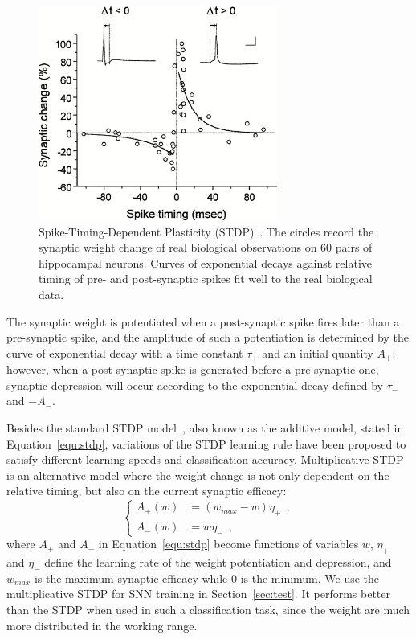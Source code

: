 \begin{figure}[bt!]
	\centering
	\includegraphics[width=0.7\textwidth]{pics_snn/stdp.jpeg}
	\caption[Spike-Timing-Dependent Plasticity (STDP)~\citep{bi2001synaptic}.]{Spike-Timing-Dependent Plasticity (STDP)~\citep{bi2001synaptic}.
	The circles record the synaptic weight change of real biological observations on 60 pairs of hippocampal neurons.
	Curves of exponential decays against relative timing of pre- and post-synaptic spikes fit well to the real biological data.
	}
	\label{Fig:STDP}
\end{figure}

The synaptic weight is potentiated when a post-synaptic spike fires later than a pre-synaptic spike, and the amplitude of such a potentiation is determined by the curve of exponential decay with a time constant $\tau_+$ and an initial quantity $A_+$;
however, when a post-synaptic spike is generated before a pre-synaptic one, synaptic depression will occur according to the exponential decay defined by $\tau_-$ and ${-A}_-$.

Besides the standard STDP model~\citep{song2000competitive}, also known as the additive model, stated in Equation~\ref{equ:stdp}, variations of the STDP learning rule have been proposed to satisfy different learning speeds and classification accuracy.
Multiplicative STDP~\citep{morrison2008phenomenological} is an alternative model where the weight change is not only dependent on the relative timing, but also on the current synaptic efficacy:
\begin{equation}
\left\{
\begin{aligned}
A_+ (w) &=  (w_{max} - w)\eta_+~~, \\
A_- (w) &= w\eta_-~~,
\end{aligned}
\right.
\end{equation}
where $A_+$ and $A_-$ in Equation~\ref{equ:stdp} become functions of variables $w$, $\eta_+$ and $\eta_-$ define the learning rate of the weight potentiation and depression, and $w_{max}$ is the maximum synaptic efficacy while 0 is the minimum.
We use the multiplicative STDP for SNN training in Section~\ref{sec:test}.
It performs better than the \DIFdelbegin {}\DIFdelend \DIFaddbegin {}\DIFaddend STDP when used in such a classification task, since the weight are much more distributed in the working range.

